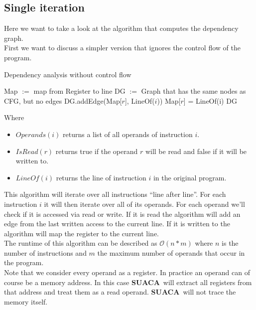 \documentclass[a4paper,12pt,titlepage, twoside]{report}
\newcommand{\suaca}{\textbf{SUACA}}
\begin{document}
\subsection{Single iteration}

Here we want to take a look at the algorithm that computes the dependency graph. \\
First we want to discuss a simpler version that ignores the control flow of the program.

\begin{algorithm}[H]
    \SetAlgoLined
    \caption{Dependency analysis without control flow}
    Map $:=$ map from Register to line\;
    DG $:=$ Graph that has the same nodes as CFG, but no edges\;
     {
          {
              {
                 DG.addEdge(Map[$r$], LineOf($i$))\;
             }{
                Map[$r$] = LineOf(i)\;
            }
        }
    }
    \Return DG\;
\end{algorithm}

Where
\begin{itemize}
    \item $Operands(i)$ returns a list of all operands of instruction $i$.
    \item $IsRead(r)$ returns true if the operand $r$ will be read and false if it will be written to.
    \item $LineOf(i)$ returns the line of instruction $i$ in the original program.
\end{itemize}

This algorithm will iterate over all instructions ``line after line''. For each instruction $i$ it will then iterate over all of its operands. For each operand we'll check if it is accessed via read or write. If it is read the algorithm will add an edge from the last written access to the current line. If it is written to the algorithm will map the register to the current line.\\

The runtime of this algorithm can be described as $\mathcal{O}(n*m)$ where $n$ is the number of instructions and $m$ the maximum number of operands that occur in the program.\\

Note that we consider every operand as a register. In practice an operand can of course be a memory address. In this case \suaca\ will extract all registers from that address and treat them as a read operand. \suaca\ will not trace the memory itself.\\
\end{document}
